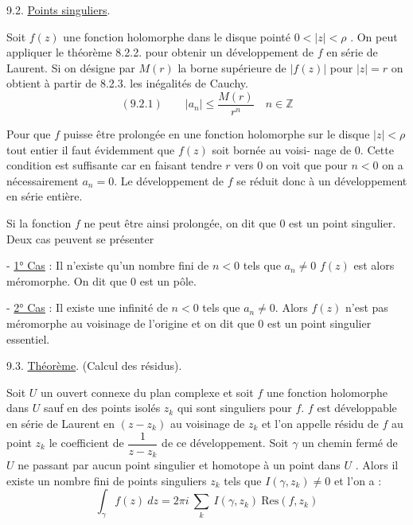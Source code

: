 
9.2. \uline{Points singuliers}.

Soit $f(z)$ une fonction holomorphe dans le disque pointé
$0 < |z| < \rho$ . On peut appliquer le théorème 8.2.2. pour obtenir un développement
de $f$ en série de Laurent. Si on désigne par $M(r)$ la borne supérieure de
$|f(z)|$ pour $|z| = r$ on obtient à partir de 8.2.3. les inégalités de Cauchy.
\[ (9.2.1) \qquad |a_n| \leq \frac{M(r)}{r^n} \quad n \in \mathbb{Z} \]

Pour que $f$ puisse être prolongée en une fonction holomorphe sur le
disque $|z| < \rho$ tout entier il faut évidemment que $f(z)$ soit bornée au voisi-%
nage de $0$. Cette condition est suffisante car en faisant tendre $r$ vers $0$
on voit que pour $n < 0$ on a nécessairement $a_n = 0$. Le développement de $f$ se
réduit donc à un développement en série entière.

Si la fonction $f$ ne peut être ainsi prolongée, on dit que $0$ est
un point singulier. Deux cas peuvent se présenter

- \uline{1° Cas} : Il n'existe qu'un nombre fini de $n < 0$ tels que $a_n \neq 0$
$f(z)$ est alors méromorphe. On dit que $0$ est un pôle.

- \uline{2° Cas} : Il existe une infinité de $n < 0$ tels que $a_n \neq 0$. Alors
$f(z)$ n'est pas méromorphe au voisinage de l'origine et on dit que $0$ est un
point singulier essentiel.

9.3. \uline{Théorème}. (Calcul des résidus).

Soit $U$ un ouvert connexe du plan complexe et soit $f$ une fonction
holomorphe dans $U$ sauf en des points isolés $z_k$ qui sont singuliers pour $f$.
$f$ est développable en série de Laurent en $(z-z_k)$ au voisinage de $z_k$ et l'on
appelle résidu de $f$ au point $z_k$ le coefficient de $\dfrac{1}{z - z_k}$ de ce développement.
Soit $\gamma$ un chemin fermé de $U$ ne passant par aucun point singulier et homotope
à un point dans $U$ . Alors il existe un nombre fini de points singuliers $z_k$
tels que $I(\gamma,z_k) \neq 0$ et l'on a :
\[ \int_\gamma f(z)\ dz = 2\pi i \ \sum_k \ I(\gamma,z_k)\ \mathrm{Res}(f,z_k) \]

